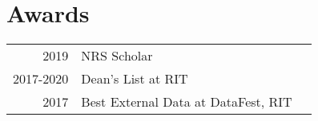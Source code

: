 \documentclass[]{deedy-resume-openfont}
\begin{document}
\begin{minipage}[t]{0.67\textwidth}


%
%


\section{Awards}
\begin{tabular}{rll}
2019         & NRS Scholar \\
2017-2020	   & Dean's List at RIT \\
2017	       & Best External Data at DataFest, RIT \\
\end{tabular}
\sectionsep

\sectionsep

\end{minipage}
\end{document}
